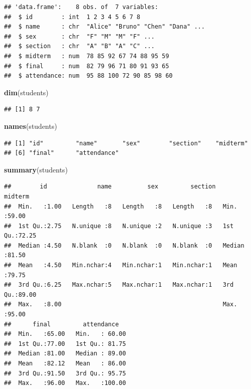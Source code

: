 \documentclass[
]{article}
\newenvironment{Shaded}{\begin{snugshade}}{\end{snugshade}}
\newcommand{\FunctionTok}[1]{\textcolor[rgb]{0.13,0.29,0.53}{\textbf{#1}}}
\newcommand{\NormalTok}[1]{#1}
\begin{document}
\begin{verbatim}
## 'data.frame':    8 obs. of  7 variables:
##  $ id        : int  1 2 3 4 5 6 7 8
##  $ name      : chr  "Alice" "Bruno" "Chen" "Dana" ...
##  $ sex       : chr  "F" "M" "M" "F" ...
##  $ section   : chr  "A" "B" "A" "C" ...
##  $ midterm   : num  78 85 92 67 74 88 95 59
##  $ final     : num  82 79 96 71 80 91 93 65
##  $ attendance: num  95 88 100 72 90 85 98 60
\end{verbatim}

\begin{Shaded}
\begin{Highlighting}[]
\FunctionTok{dim}\NormalTok{(students)}
\end{Highlighting}
\end{Shaded}

\begin{verbatim}
## [1] 8 7
\end{verbatim}

\begin{Shaded}
\begin{Highlighting}[]
\FunctionTok{names}\NormalTok{(students)}
\end{Highlighting}
\end{Shaded}

\begin{verbatim}
## [1] "id"         "name"       "sex"        "section"    "midterm"   
## [6] "final"      "attendance"
\end{verbatim}

\begin{Shaded}
\begin{Highlighting}[]
\FunctionTok{summary}\NormalTok{(students)}
\end{Highlighting}
\end{Shaded}

\begin{verbatim}
##        id              name          sex         section     midterm     
##  Min.   :1.00   Length   :8   Length   :8   Length   :8   Min.   :59.00  
##  1st Qu.:2.75   N.unique :8   N.unique :2   N.unique :3   1st Qu.:72.25  
##  Median :4.50   N.blank  :0   N.blank  :0   N.blank  :0   Median :81.50  
##  Mean   :4.50   Min.nchar:4   Min.nchar:1   Min.nchar:1   Mean   :79.75  
##  3rd Qu.:6.25   Max.nchar:5   Max.nchar:1   Max.nchar:1   3rd Qu.:89.00  
##  Max.   :8.00                                             Max.   :95.00  
##      final         attendance    
##  Min.   :65.00   Min.   : 60.00  
##  1st Qu.:77.00   1st Qu.: 81.75  
##  Median :81.00   Median : 89.00  
##  Mean   :82.12   Mean   : 86.00  
##  3rd Qu.:91.50   3rd Qu.: 95.75  
##  Max.   :96.00   Max.   :100.00
\end{verbatim}
\end{document}
